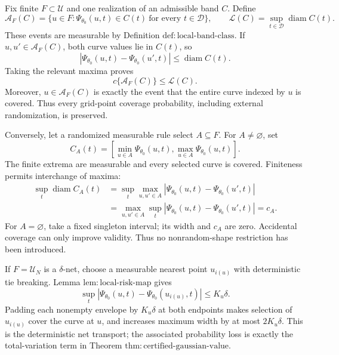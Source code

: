 Fix finite \(F\subset\mathcal U\) and one realization of an admissible band \(C\).  Define
\[
 \mathcal A_F(C)=
 \{u\in F:\Psi_{\theta_0}(u,t)\in C(t)\ \text{for every }t\in\mathcal D\},
 \qquad
 \mathcal L(C)=\sup_{t\in\mathcal D}\operatorname{diam}C(t).
\tag{10}
\]
These events are measurable by Definition \(\mathrm{def:local\mbox{-}band\mbox{-}class}\).  If \(u,u'\in\mathcal A_F(C)\), both curve values lie in \(C(t)\), so
\[
 |\Psi_{\theta_0}(u,t)-\Psi_{\theta_0}(u',t)|
 \leq\operatorname{diam}C(t).
\]
Taking the relevant maxima proves
\[
 c\{\mathcal A_F(C)\}\leq\mathcal L(C).
\tag{11}
\]
Moreover, \(u\in\mathcal A_F(C)\) is exactly the event that the entire curve indexed by \(u\) is covered.  Thus every grid-point coverage probability, including external randomization, is preserved.

Conversely, let a randomized measurable rule select \(A\subseteq F\).  For \(A\neq\varnothing\), set
\[
 C_A(t)=
 \left[\min_{u\in A}\Psi_{\theta_0}(u,t),
       \max_{u\in A}\Psi_{\theta_0}(u,t)\right].
\tag{12}
\]
The finite extrema are measurable and every selected curve is covered.  Finiteness permits interchange of maxima:
\[
\begin{aligned}
 \sup_t\operatorname{diam}C_A(t)
 &=\sup_t\max_{u,u'\in A}
 |\Psi_{\theta_0}(u,t)-\Psi_{\theta_0}(u',t)|\\
 &=\max_{u,u'\in A}\sup_t
 |\Psi_{\theta_0}(u,t)-\Psi_{\theta_0}(u',t)|
 =c_A.
\end{aligned}
\tag{13}
\]
For \(A=\varnothing\), take a fixed singleton interval; its width and \(c_A\) are zero.  Accidental coverage can only improve validity.  Thus no nonrandom-shape restriction has been introduced.

If \(F=\mathcal U_N\) is a \(\delta\)-net, choose a measurable nearest point \(u_{i(u)}\) with deterministic tie breaking.  Lemma \(\mathrm{lem:local\mbox{-}risk\mbox{-}map}\) gives
\[
 \sup_t|\Psi_{\theta_0}(u,t)-\Psi_{\theta_0}(u_{i(u)},t)|
 \leq K_u\delta.
\tag{14}
\]
Padding each nonempty envelope by \(K_u\delta\) at both endpoints makes selection of \(u_{i(u)}\) cover the curve at \(u\), and increases maximum width by at most \(2K_u\delta\).  This is the deterministic net transport; the associated probability loss is exactly the total-variation term in Theorem \(\mathrm{thm:certified\mbox{-}gaussian\mbox{-}value}\).

